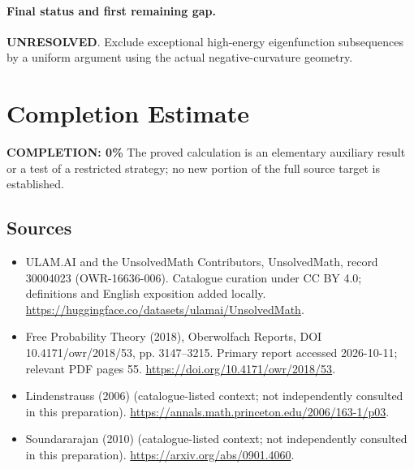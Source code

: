 \documentclass[11pt]{article}
\begin{document}
\paragraph{Final status and first remaining gap.}
\textbf{UNRESOLVED}. Exclude exceptional high-energy eigenfunction subsequences by a uniform argument using the actual negative-curvature geometry.

\section{Completion Estimate}
\noindent\textbf{COMPLETION: 0\%}
The proved calculation is an elementary auxiliary result or a test of a restricted strategy; no new portion of the full source target is established.

\subsection{Sources}
\begin{itemize}
\item[\hypertarget{source:30004023:1}{S1}] ULAM.AI and the UnsolvedMath Contributors, UnsolvedMath, record 30004023 (OWR-16636-006). Catalogue curation under CC BY 4.0; definitions and English exposition added locally.
\url{https://huggingface.co/datasets/ulamai/UnsolvedMath}.
\item[\hypertarget{source:30004023:2}{S2}] Free Probability Theory (2018), Oberwolfach Reports, DOI 10.4171/owr/2018/53, pp. 3147--3215. Primary report accessed 2026-10-11; relevant PDF pages 55.
\url{https://doi.org/10.4171/owr/2018/53}.
\item[\hypertarget{source:30004023:3}{S3}] Lindenstrauss (2006) (catalogue-listed context; not independently consulted in this preparation).
\url{https://annals.math.princeton.edu/2006/163-1/p03}.
\item[\hypertarget{source:30004023:4}{S4}] Soundararajan (2010) (catalogue-listed context; not independently consulted in this preparation).
\url{https://arxiv.org/abs/0901.4060}.
\end{itemize}
\label{end:30004023}
\end{document}
